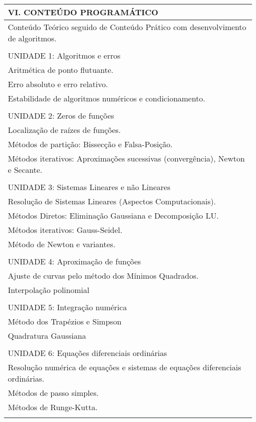 \documentclass[12pt]{article}
\begin{document}
\begin{longtable}{|L{1.025\textwidth}|} \hline
%
{\bf VI. CONTEÚDO PROGRAMÁTICO } \\ \hline
Conteúdo Teórico seguido de Conteúdo Prático com desenvolvimento de algoritmos.\\
\\
UNIDADE 1: Algoritmos e erros\\
Aritmética de ponto flutuante.\\
Erro absoluto e erro relativo.\\
Estabilidade de algoritmos numéricos e condicionamento.\\
\\
UNIDADE 2: Zeros de funções\\
Localização de raízes de funções.\\
Métodos de partição: Bissecção e Falsa-Posição.\\
Métodos iterativos: Aproximações sucessivas (convergência), Newton e Secante.\\
\\
UNIDADE 3: Sistemas Lineares e não Lineares\\
Resolução de Sistemas Lineares (Aspectos Computacionais).\\
Métodos Diretos: Eliminação Gaussiana e Decomposição LU.\\
Métodos iterativos: Gauss-Seidel.\\
Método de Newton e variantes.\\
\\
UNIDADE 4: Aproximação de funções\\
Ajuste de curvas pelo método dos Mínimos Quadrados.\\
Interpolação polinomial\\
\\
UNIDADE 5: Integração numérica\\
Método dos Trapézios e Simpson\\
Quadratura Gaussiana\\
\\
UNIDADE 6: Equações diferenciais ordinárias\\
Resolução numérica de equações e sistemas de equações diferenciais ordinárias. \\
Métodos de passo simples.\\
Métodos de Runge-Kutta.\\

\\ \hline
\end{longtable} 
\end{document}
